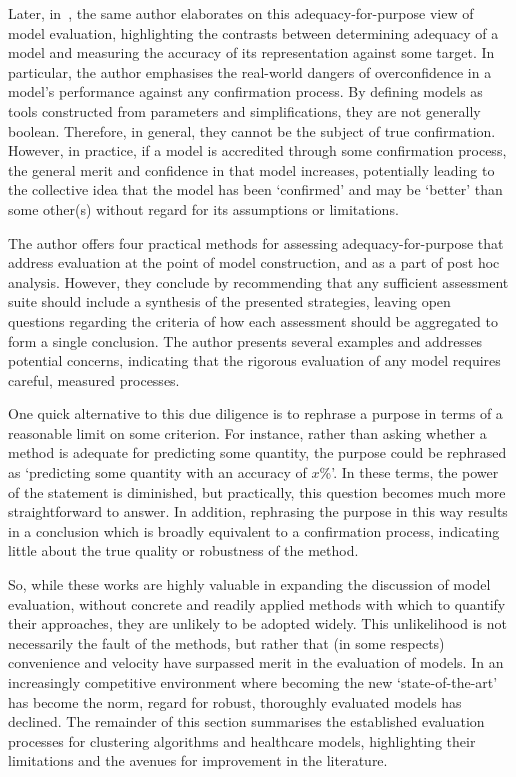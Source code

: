 Later, in~\cite{Parker2020}, the same author elaborates on this
adequacy-for-purpose view of model evaluation, highlighting the contrasts
between determining adequacy of a model and measuring the accuracy of its
representation against some target. In particular, the author emphasises the
real-world dangers of overconfidence in a model's performance against any
confirmation process. By defining models as tools constructed from parameters
and simplifications, they are not generally boolean. Therefore, in general, they
cannot be the subject of true confirmation. However, in practice, if a model is
accredited through some confirmation process, the general merit and confidence
in that model increases, potentially leading to the collective idea that the
model has been `confirmed' and may be `better' than some other(s) without regard
for its assumptions or limitations.

The author offers four practical methods for assessing adequacy-for-purpose that
address evaluation at the point of model construction, and as a part of post hoc
analysis. However, they conclude by recommending that any sufficient assessment
suite should include a synthesis of the presented strategies, leaving open
questions regarding the criteria of how each assessment should be aggregated to
form a single conclusion. The author presents several examples and addresses
potential concerns, indicating that the rigorous evaluation of any model
requires careful, measured processes.

One quick alternative to this due diligence is to rephrase a purpose in terms of
a reasonable limit on some criterion. For instance, rather than asking whether a
method is adequate for predicting some quantity, the purpose could be rephrased
as `predicting some quantity with an accuracy of \(x\)\%'. In these terms, the
power of the statement is diminished, but practically, this question becomes
much more straightforward to answer. In addition, rephrasing the purpose in this
way results in a conclusion which is broadly equivalent to a confirmation
process, indicating little about the true quality or robustness of the method.

So, while these works are highly valuable in expanding the discussion of model
evaluation, without concrete and readily applied methods with which to quantify
their approaches, they are unlikely to be adopted widely. This unlikelihood is
not necessarily the fault of the methods, but rather that (in some respects)
convenience and velocity have surpassed merit in the evaluation of models. In an
increasingly competitive environment where becoming the new `state-of-the-art'
has become the norm, regard for robust, thoroughly evaluated models has
declined. The remainder of this section summarises the established evaluation
processes for clustering algorithms and healthcare models, highlighting their
limitations and the avenues for improvement in the literature.

